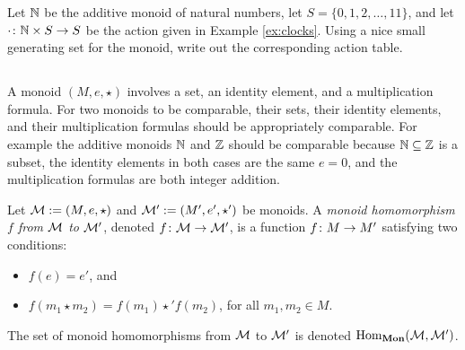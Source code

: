 \begin{exampleRUS}\label{ex:multiplication table}
\end{exampleRUS}

\begin{exerciseENG}
Let ${\mathbb N}$ be the additive monoid of natural numbers, let $S=\{0,1,2,\ldots,11\}$, and let $\cdot\colon{\mathbb N}\times S\rightarrow S$ be the action given in Example \ref{ex:clocks}. Using a nice small generating set for the monoid, write out the corresponding action table.
\end{exerciseENG}

\begin{exerciseRUS}
\end{exerciseRUS}


\subsection{}

\begin{blockENG}
A monoid $(M,e,\star)$ involves a set, an identity element, and a multiplication formula. For two monoids to be comparable, their sets, their identity elements, and their multiplication formulas should be appropriately comparable. For example the additive monoids ${\mathbb N}$ and ${\mathbb Z}$ should be comparable because ${\mathbb N}\subseteq{\mathbb Z}$ is a subset, the identity elements in both cases are the same $e=0$, and the multiplication formulas are both integer addition. 
\end{blockENG}

\begin{definitionENG}\label{def:monoid hom}
Let $\mathcal{M}:=(M,e,\star)$ and $\mathcal{M}':=(M',e',\star')$ be monoids. A {\em monoid homomorphism $f$ from $\mathcal{M}$ to $\mathcal{M}'$}, denoted $f\colon\mathcal{M}\rightarrow\mathcal{M}'$, is a function $f\colon M\rightarrow M'$ satisfying two conditions:
\begin{itemize}
\item $f(e)=e'$, and 
\item $f(m_1\star m_2)=f(m_1)\star'f(m_2)$, for all $m_1,m_2\in M$.
\end{itemize}
The set of monoid homomorphisms from $\mathcal{M}$ to $\mathcal{M}'$ is denoted $\textnormal{Hom}_{{\bf Mon}}(\mathcal{M},\mathcal{M}')$.
\end{definitionENG}

\begin{definitionRUS}\label{def:monoid hom}
\end{definitionRUS}


